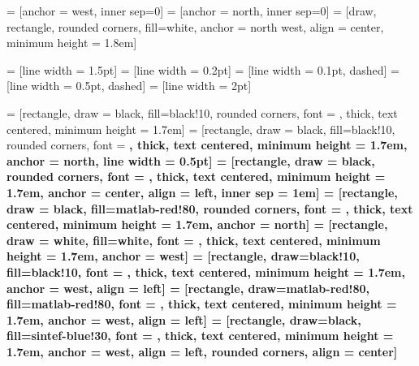 \usepackage{tikz}

\usetikzlibrary{calc, tikzmark, arrows, shapes, positioning, backgrounds}



\usepackage{pgfplots}

\usepackage[active,tightpage]{preview}
\setlength\PreviewBorder{0pt}

\usepackage{amsmath, amsfonts, amssymb}
\usepackage[outdir=./]{epstopdf}

\usepackage{tikz}
\usetikzlibrary{calc, tikzmark, arrows, shapes, positioning, backgrounds}

 = [anchor = west, inner sep=0]
 = [anchor = north, inner sep=0]
 = [draw, rectangle, rounded corners, fill=white, anchor = north west, align = center, minimum height = 1.8em]

 = [line width = 1.5pt]
 = [line width = 0.2pt]
 = [line width = 0.1pt, dashed]
 = [line width = 0.5pt, dashed]
 = [line width = 2pt]

 = [rectangle, draw = black, fill=black!10, rounded corners, font = \small, thick, text centered, minimum height = 1.7em]
 = [rectangle, draw = black, fill=black!10, rounded corners, font = \small\bfseries, thick, text centered, minimum height = 1.7em, anchor = north, line width = 0.5pt]
 = [rectangle, draw = black, rounded corners, font = \small, thick, text centered, minimum height = 1.7em, anchor = center, align = left, inner sep = 1em]
 = [rectangle, draw = black, fill=matlab-red!80, rounded corners, font = \small, thick, text centered, minimum height = 1.7em, anchor = north]
 = [rectangle, draw = white, fill=white, font = \small\bfseries, thick, text centered, minimum height = 1.7em, anchor = west]
 = [rectangle, draw=black!10, fill=black!10, font = \small, thick, text centered, minimum height = 1.7em, anchor = west, align = left]
 = [rectangle, draw=matlab-red!80, fill=matlab-red!80, font = \small, thick, text centered, minimum height = 1.7em, anchor = west, align = left]
 = [rectangle, draw=black, fill=sintef-blue!30, font = \small, thick, text centered, minimum height = 1.7em, anchor = west, align = left, rounded corners, align = center]


